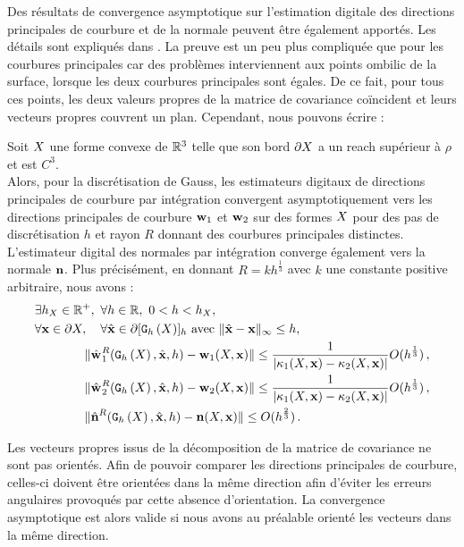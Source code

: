 Des résultats de convergence asymptotique sur l'estimation digitale des
directions principales de courbure et de la normale peuvent être également
apportés. Les détails sont expliqués dans \cite{ChapterIICurvature}. La preuve
est un peu plus compliquée que pour les courbures principales car des problèmes
interviennent aux points ombilic de la surface, \cad lorsque les deux courbures
principales sont égales. De ce fait, pour tous ces points, les deux valeurs
propres de la matrice de covariance coïncident et leurs vecteurs propres
couvrent un plan. Cependant, nous pouvons écrire :
%
\begin{theorem}{}
\label{thm:multigrid-conv-principal-directions-and-normal}
  Soit $X$ une forme convexe de $\mathbb{R}^3$ telle que son bord $\partial X$ a un
  reach supérieur à $\rho$ et est $C^3$.
  \\
  Alors, pour la discrétisation de Gauss, les estimateurs digitaux de directions
  principales de courbure par intégration convergent asymptotiquement vers les
  directions principales de courbure $\mathbf{w}_{1}$ et $\mathbf{w}_{2}$ sur des
  formes $X$ pour des pas de discrétisation $h$ et rayon $R$ donnant des
  courbures principales distinctes. L'estimateur digital des normales par
  intégration converge également vers la normale $\mathbf{n}$. Plus précisément,
  en donnant $R=k h^{\frac{1}{3}}$ avec $k$ une constante positive arbitraire,
  nous avons :
  \begin{align}
    &\exists h_{X} \in \mathbb{R}^+,\,\, \forall h \in \mathbb{R},\,\, 0 < h < h_{X},\,\,
     \,\,\nonumber\quad \quad\quad \quad\\
    &\forall \mathbf{x} \in \partial X, \quad \forall \hat{\mathbf{x}} \in \partial \lbrack \mathtt{G}_{h}\left(X\right) \rbrack_{h}  \text{~avec~} \| \hat{\mathbf{x}} -\mathbf{x}\|_\infty
    \le h, \nonumber\quad \quad\quad \quad \\
    &\quad \quad\quad \quad\| \hat{\mathbf{w}_{}}_{1}^{R}( \mathtt{G}_{h}\left(X\right), \hat{\mathbf{x}}, h ) - \mathbf{w}_{1}(X, \mathbf{x}) \|
    \le \frac{1}{|\kappa_{1}(X,\mathbf{x})-\kappa_{2}(X,\mathbf{x})|} O(h^{\frac{1}{3}})\,, \\
    &\quad \quad\quad \quad\| \hat{\mathbf{w}_{}}_{2}^{R}( \mathtt{G}_{h}\left(X\right), \hat{\mathbf{x}}, h ) - \mathbf{w}_{2}(X, \mathbf{x}) \|
    \le \frac{1}{|\kappa_{1}(X,\mathbf{x})-\kappa_{2}(X,\mathbf{x})|} O(h^{\frac{1}{3}})\,, \\
    &\quad \quad\quad \quad\| \hat{\mathbf{n}{}}^{R}( \mathtt{G}_{h}\left(X\right), \hat{\mathbf{x}}, h ) - \mathbf{n}(X, \mathbf{x}) \|
    \le O(h^{\frac{2}{3}})\,.
  \end{align}
\end{theorem}
%
Les vecteurs propres issus de la décomposition de la matrice de covariance ne
sont pas orientés. Afin de pouvoir comparer les directions principales de
courbure, celles-ci doivent être orientées dans la même direction afin d'éviter
les erreurs angulaires provoqués par cette absence d'orientation. La convergence
asymptotique est alors valide si nous avons au préalable orienté les vecteurs dans
la même direction.


